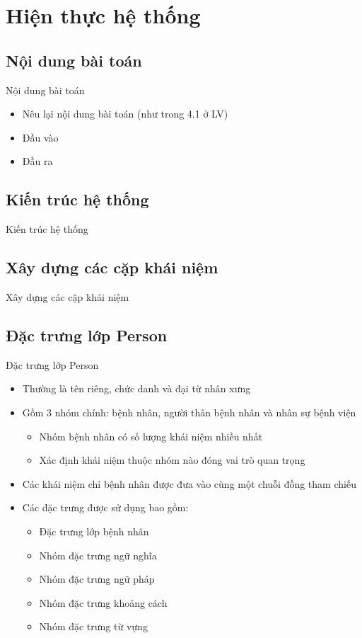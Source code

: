 \section{Hiện thực hệ thống}
\subsection{Nội dung bài toán}
\begin{frame}{Nội dung bài toán}
\putlogo
\begin{itemize}
\item Nêu lại nội dung bài toán (như trong 4.1 ở LV)
\item Đầu vào
\item Đầu ra
\end{itemize}
\end{frame}

\subsection{Kiến trúc hệ thống}
\begin{frame}{Kiến trúc hệ thống}
\putlogo
\end{frame}

\subsection{Xây dựng các cặp khái niệm}
\begin{frame}{Xây dựng các cặp khái niệm}
\putlogo
\end{frame}

\subsection{Đặc trưng lớp Person}
\begin{frame}{Đặc trưng lớp Person}
\putlogo
\begin{itemize}
	\item Thường là tên riêng, chức danh và đại từ nhân xưng
	\item Gồm 3 nhóm chính: bệnh nhân, người thân bệnh nhân và nhân sự bệnh viện
	\begin{itemize}
		\item Nhóm bệnh nhân có số lượng khái niệm nhiều nhất
		\item Xác định khái niệm thuộc nhóm nào đóng vai trò quan trọng
	\end{itemize}
	\item Các khái niệm chỉ bệnh nhân được đưa vào cùng một chuỗi đồng tham chiếu
	\item Các đặc trưng được sử dụng bao gồm:
	\begin{itemize}
		\item Đặc trưng lớp bệnh nhân
		\item Nhóm đặc trưng ngữ nghĩa
		\item Nhóm đặc trưng ngữ pháp
		\item Nhóm đặc trưng khoảng cách
		\item Nhóm đặc trưng từ vựng
	\end{itemize}
\end{itemize}
\end{frame}

